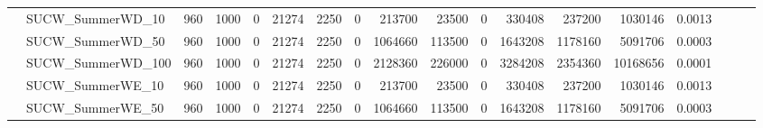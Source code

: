\begin{landscape}
\begin{longtable}[c]{llrrrrrrrrrrrrrlll}
		& SUCW\_SummerWD\_10           & 960                         & 1000                       & 0                          & 21274                       & 2250                       & 0                          & 213700                     & 23500                     & 0                         & 330408                     & 237200                     & 1030146                        & 0.0013                        &                          &                          &                          \\
		& SUCW\_SummerWD\_50           & 960                         & 1000                       & 0                          & 21274                       & 2250                       & 0                          & 1064660                    & 113500                    & 0                         & 1643208                    & 1178160                    & 5091706                        & 0.0003                        &                          &                          &                          \\
		& SUCW\_SummerWD\_100          & 960                         & 1000                       & 0                          & 21274                       & 2250                       & 0                          & 2128360                    & 226000                    & 0                         & 3284208                    & 2354360                    & 10168656                       & 0.0001                        &                          &                          &                          \\
		& SUCW\_SummerWE\_10           & 960                         & 1000                       & 0                          & 21274                       & 2250                       & 0                          & 213700                     & 23500                     & 0                         & 330408                     & 237200                     & 1030146                        & 0.0013                        &                          &                          &                          \\
		& SUCW\_SummerWE\_50           & 960                         & 1000                       & 0                          & 21274                       & 2250                       & 0                          & 1064660                    & 113500                    & 0                         & 1643208                    & 1178160                    & 5091706                        & 0.0003                        &                          &                          &                          \\

\end{longtable}
\end{landscape}

